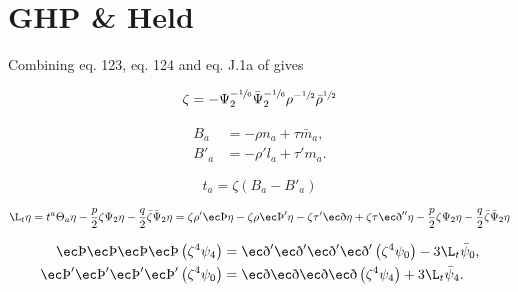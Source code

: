 \section{GHP \& Held}

Combining eq. 123, eq. 124 and eq. J.1a of \cite{Hollands:2024iqp} gives

\begin{equation}
\zeta = - \Psi^{-\sfrac{1}{6}}_2 \bar{\Psi}^{-\sfrac{1}{6}}_2 \rho^{-\sfrac{1}{2}} \bar{\rho}^{\sfrac{1}{2}}
\end{equation}

\begin{equation}
\begin{split}
B_a &= -\rho n_a + \tau \bar{m}_a,\\
B'_a &= -\rho' l_a + \tau' m_a.
\end{split}
\end{equation}

\begin{equation}
t_a = \zeta (B_a - B'_a )
\end{equation}

\begin{equation}
\L_t \eta = t^a \Theta_a \eta - \frac{p}{2} \zeta \Psi_2  \eta - \frac{q}{2} \bar{\zeta} \bar{\Psi}_2  \eta = \zeta \rho' \thorn \eta -\zeta \rho \thorn' \eta - \zeta \tau' \eth \eta + \zeta \tau \eth'' \eta - \frac{p}{2} \zeta \Psi_2  \eta - \frac{q}{2} \bar{\zeta} \bar{\Psi}_2  \eta
\end{equation}


\begin{equation}
\begin{split}
\thorn \thorn \thorn \thorn \left( \zeta^4 \psi_4 \right)&= \eth' \eth' \eth' \eth' \left( \zeta^4 \psi_0 \right)  - 3 \L_t \bar{\psi}_0,\\
\thorn' \thorn' \thorn' \thorn' \left( \zeta^4 \psi_0 \right)&= \eth \eth \eth \eth \left( \zeta^4 \psi_4 \right)  + 3 \L_t \bar{\psi}_4.
\end{split}
\end{equation}